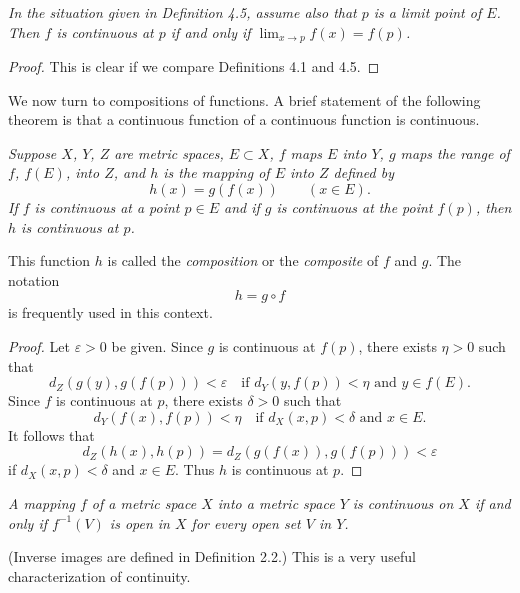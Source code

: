 \emph{In the situation given in Definition 4.5, assume also that $p$ is a
limit point of $E$. Then $f$ is continuous at $p$ if and only if
$\lim_{x\to p} f(x) = f(p)$.}

\begin{proof}
This is clear if we compare Definitions 4.1 and 4.5.
\end{proof}

We now turn to compositions of functions. A brief statement of the following
theorem is that a continuous function of a continuous function is continuous.

\emph{Suppose $X$, $Y$, $Z$ are metric spaces, $E \subset X$, $f$ maps $E$
into $Y$, $g$ maps the range of $f$, $f(E)$, into $Z$, and $h$ is the mapping
of $E$ into $Z$ defined by}
\[ h(x) = g(f(x)) \qquad (x \in E). \]
\emph{If $f$ is continuous at a point $p \in E$ and if $g$ is continuous at
the point $f(p)$, then $h$ is continuous at $p$.}

This function $h$ is called the \emph{composition} or the \emph{composite} of
$f$ and $g$. The notation
\[ h = g \circ f \]
is frequently used in this context.

\begin{proof}
Let $\varepsilon > 0$ be given. Since $g$ is continuous at $f(p)$, there
exists $\eta > 0$ such that
\[ d_Z(g(y),g(f(p))) < \varepsilon \quad\text{if } d_Y(y,f(p)) < \eta
   \text{ and } y \in f(E). \]
Since $f$ is continuous at $p$, there exists $\delta > 0$ such that
\[ d_Y(f(x),f(p)) < \eta \quad\text{if } d_X(x,p) < \delta \text{ and }
   x \in E. \]
It follows that
\[ d_Z(h(x),h(p)) = d_Z(g(f(x)),g(f(p))) < \varepsilon \]
if $d_X(x,p) < \delta$ and $x \in E$. Thus $h$ is continuous at
$p$.
\end{proof}

\emph{A mapping $f$ of a metric space $X$ into a metric space $Y$ is
continuous on $X$ if and only if $f^{-1}(V)$ is open in $X$ for every open
set $V$ in $Y$.}

(Inverse images are defined in Definition 2.2.) This is a very useful
characterization of continuity.

